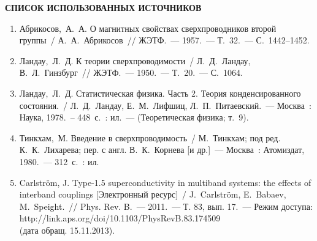 \documentclass[notitlepage,pscyr]{hedwork}
\begin{document}
  \onehalfspacing
  
  \begin{center}
    \bf
    СПИСОК ИСПОЛЬЗОВАННЫХ ИСТОЧНИКОВ
  \end{center}
  
  \begin{enumerate}
    \item Абрикосов,~А.~А. О магнитных свойствах сверхпроводников второй
      группы~/ А.~А.~Абрикосов~// ЖЭТФ.~--- 1957.~--- Т.~32.~--- С.~1442--1452.
    \item Ландау,~Л.~Д. К теории сверхпроводимости~/ Л.~Д.~Ландау,
      В.~Л.~Гинзбург~// ЖЭТФ.~--- 1950.~--- Т.~20.~--- С.~1064.
    \item Ландау,~Л.~Д. Статистическая физика. Часть 2. Теория
      конденсированного состояния.~/ Л.~Д.~Ландау, Е.~М.~Лифшиц,
      Л.~П.~Питаевский.~--- Москва~: Наука, 1978.~-- 448~с.~: ил.~---
      (Теоретическая физика; т.~9).
    \item Тинкхам,~М. Введение в сверхпроводимость~/
      М.~Тинкхам; под ред. К.~К.~Лихарева; пер. с англ. В.~К.~Корнева
      [и др.]~--- Москва~: Атомиздат, 1980.~--- 312~с.~: ил.
    \item Carlstr\"om, J. Type-1.5 superconductivity in multiband systems:
      the effects of interband couplings [Электронный ресурс]~/ J.~Carlstr\"om,
      E.~Babaev, M.~Speight.~// Phys. Rev. B.~--- 2011.~--- Т. 83, вып. 17.~---
      Режим доступа: http://link.aps.org/doi/10.1103/PhysRevB.83.174509\\
      (дата обращ. 15.11.2013).
  \end{enumerate}
\end{document}
